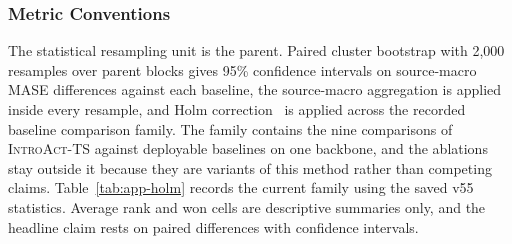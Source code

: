 \documentclass{article}
\newcommand{\introact}{\textsc{IntroAct-TS}}
\begin{document}
\subsubsection{Metric Conventions}
\label{app:metric-conventions}
The statistical resampling unit is the parent. Paired cluster bootstrap with 2,000 resamples
over parent blocks gives 95\% confidence intervals on source-macro MASE differences against
each baseline, the source-macro aggregation is applied inside every resample, and Holm
correction~\citep{holm1979simple} is applied across the recorded baseline comparison family.
The family contains the nine comparisons of \introact{} against deployable baselines on
one backbone, and the ablations stay outside it because they are variants of this method rather
than competing claims. Table~\ref{tab:app-holm} records the current family using the saved v55 statistics.
Average rank and won cells are descriptive summaries only, and the headline claim rests on
paired differences with confidence intervals.
\end{document}
